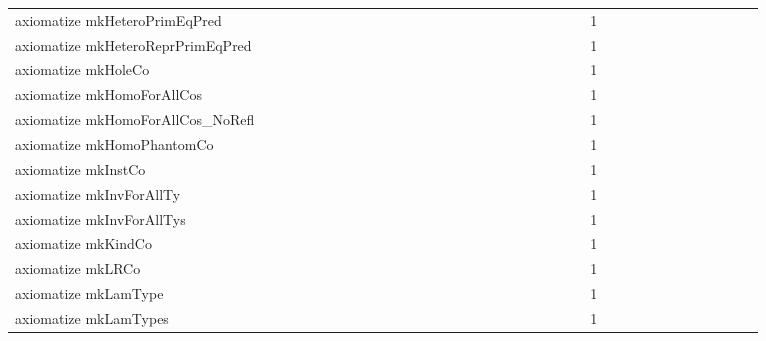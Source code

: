 {\begin{tabular}{l|rrr|rrr|rrr}
axiomatize mkHeteroPrimEqPred &  &  &  &  &  &  &  &  &  &  &  &  &  &  &  &  &  &  &  &  &  &  &  & 1 &  &  &  &  &  &  &  &  &  &  &  & \\
axiomatize mkHeteroReprPrimEqPred &  &  &  &  &  &  &  &  &  &  &  &  &  &  &  &  &  &  &  &  &  &  &  & 1 &  &  &  &  &  &  &  &  &  &  &  & \\
axiomatize mkHoleCo &  &  &  &  &  &  &  &  &  &  &  &  &  &  &  &  &  &  &  &  &  &  &  & 1 &  &  &  &  &  &  &  &  &  &  &  & \\
axiomatize mkHomoForAllCos &  &  &  &  &  &  &  &  &  &  &  &  &  &  &  &  &  &  &  &  &  &  &  & 1 &  &  &  &  &  &  &  &  &  &  &  & \\
axiomatize mkHomoForAllCos_NoRefl &  &  &  &  &  &  &  &  &  &  &  &  &  &  &  &  &  &  &  &  &  &  &  & 1 &  &  &  &  &  &  &  &  &  &  &  & \\
axiomatize mkHomoPhantomCo &  &  &  &  &  &  &  &  &  &  &  &  &  &  &  &  &  &  &  &  &  &  &  & 1 &  &  &  &  &  &  &  &  &  &  &  & \\
axiomatize mkInstCo &  &  &  &  &  &  &  &  &  &  &  &  &  &  &  &  &  &  &  &  &  &  &  & 1 &  &  &  &  &  &  &  &  &  &  &  & \\
axiomatize mkInvForAllTy &  &  &  &  &  &  &  &  &  &  &  &  &  &  &  &  &  &  &  &  &  &  &  & 1 &  &  &  &  &  &  &  &  &  &  &  & \\
axiomatize mkInvForAllTys &  &  &  &  &  &  &  &  &  &  &  &  &  &  &  &  &  &  &  &  &  &  &  & 1 &  &  &  &  &  &  &  &  &  &  &  & \\
axiomatize mkKindCo &  &  &  &  &  &  &  &  &  &  &  &  &  &  &  &  &  &  &  &  &  &  &  & 1 &  &  &  &  &  &  &  &  &  &  &  & \\
axiomatize mkLRCo &  &  &  &  &  &  &  &  &  &  &  &  &  &  &  &  &  &  &  &  &  &  &  & 1 &  &  &  &  &  &  &  &  &  &  &  & \\
axiomatize mkLamType &  &  &  &  &  &  &  &  &  &  &  &  &  &  &  &  &  &  &  &  &  &  &  & 1 &  &  &  &  &  &  &  &  &  &  &  & \\
axiomatize mkLamTypes &  &  &  &  &  &  &  &  &  &  &  &  &  &  &  &  &  &  &  &  &  &  &  & 1 &  &  &  &  &  &  &  &  &  &  &  & \\

\end{tabular}}
